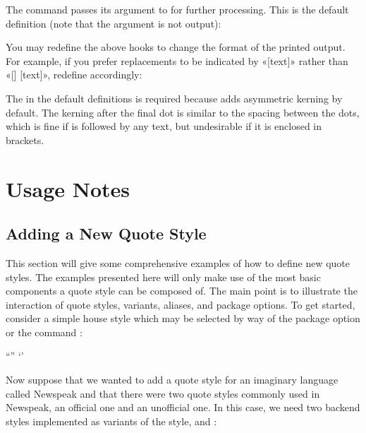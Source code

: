 \documentclass{ltxdockit}[2010/09/26]
\begin{document}
\begin{ltxcode}[showspaces=true]
\newcommand{<<\mktextins>>}[1]{[#1]}
\newcommand{<<\mktextmod>>}[1]{[#1]}
\end{ltxcode}
%
The  command passes its  argument to  for further processing. This is the default definition (note that the argument is not output):

\begin{ltxcode}[showspaces=true]
\newcommand{<<\mktextdel>>}[1]{[]}
\end{ltxcode}
%
You may redefine the above hooks to change the format of the printed output. For example, if you prefer replacements to be indicated by «[\textellipsis text]» rather than «[\textellipsis\unkern] [text]», redefine  accordingly:

\begin{ltxcode}
\renewcommand{<<\mktextelpins>>}[1]{[\textellipsis #1]}
\end{ltxcode}
%
The  in the default definitions is required because  adds asymmetric kerning by default. The kerning after the final dot is similar to the spacing between the dots, which is fine if  is followed by any text, but undesirable if it is enclosed in brackets.

\section{Usage Notes}
\label{use}

\subsection{Adding a New Quote Style}
\label{use:spl}

This section will give some comprehensive examples of how to define new quote styles. The examples presented here will only make use of the most basic components a quote style can be composed of. The main point is to illustrate the interaction of quote styles, variants, aliases, and package options. To get started, consider a simple house style which may be selected by way of the package option  or the command :

\begin{ltxcode}
  {\textquotedblleft}{\textquotedblright}
  {\textquoteleft}{\textquoteright}
\end{ltxcode}
%
Now suppose that we wanted to add a quote style for an imaginary language called Newspeak and that there were two quote styles commonly used in Newspeak, an official one and an unofficial one. In this case, we need two backend styles implemented as variants of the  style,  and :
\end{document}
